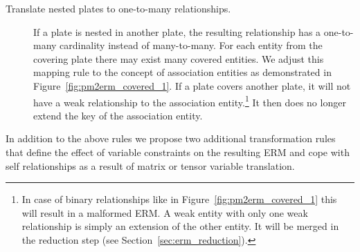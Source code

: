 \begin{description}
\item[Translate nested plates to one-to-many relationships.] If a plate is nested in another plate, the resulting relationship has a one-to-many cardinality instead of many-to-many. For each entity from the covering plate there may exist many covered entities. We adjust this mapping rule to the concept of association entities as demonstrated in Figure~\ref{fig:pm2erm_covered_1}. If a plate covers another plate, it will not have a weak relationship to the association entity.\footnote{In case of binary relationships like in Figure~\ref{fig:pm2erm_covered_1} this will result in a malformed ERM. A weak entity with only one weak relationship is simply an extension of the other entity. It will be merged in the reduction step (see Section~\ref{sec:erm_reduction}).} It then does no longer extend the key of the association entity.
\end{description}

In addition to the above rules we propose two additional transformation rules that define the effect of variable constraints on the resulting ERM and cope with self relationships as a result of matrix or tensor variable translation.

